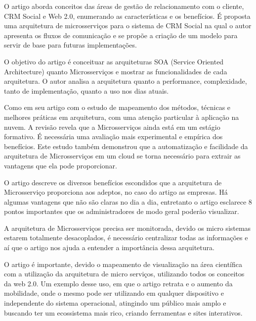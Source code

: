 O artigo \cite{Chiaradia2018} aborda conceitos das áreas de gestão de relacionamento com o cliente, CRM Social e Web 2.0, enumerando as características e os benefícios. É proposta uma arquitetura de microsserviços para o sistema de CRM Social na qual o autor apresenta os fluxos de comunicação e se propõe a criação de um modelo para servir de base para futuras implementações. 

O objetivo do artigo \cite{TomasCerny2017} é conceituar as arquiteturas SOA (Service Oriented Architecture) quanto Microsserviços e mostrar as funcionalidades de cada arquitetura. O autor analisa a arquitetura quanto a performance, complexidade, tanto de implementação, quanto a uso nos dias atuais. 

Como \cite{Pahl2016} em seu artigo com o estudo de mapeamento dos métodos, técnicas e melhores práticas em arquitetura, com uma atenção particular à aplicação na nuvem. A revisão revela que a Microsserviços ainda está em um estágio formativo. É necessária uma avaliação mais experimental e empírica dos benefícios. Este estudo também demonstrou que a automatização e facilidade da arquitetura de Microsserviços em um cloud se torna necessário para extrair as vantagens que ela pode proporcionar.

O artigo \cite{Tom2016} descreve os diversos benefícios escondidos que a arquitetura de Microsserviço proporciona aos adeptos, no caso do artigo as empresas. Há algumas vantagens que não são claras no dia a dia, entretanto o artigo esclarece 8 pontos importantes que os administradores de modo geral poderão visualizar.

A arquitetura de Microsserviços  precisa ser monitorada, devido os micro sistemas estarem totalmente desacoplados, é necessário centralizar todas as informações e aí que o artigo \cite{Ghirotti2018} nos ajuda a entender a importância dessa arquitetura.

O artigo \cite{Raji2015} é importante, devido o mapeamento de visualização na área científica com a utilização da arquitetura de micro serviços, utilizando todos os conceitos da web 2.0. Um exemplo desse uso, em que o artigo retrata e o aumento da mobilidade, onde o mesmo pode ser utilizando em qualquer dispositivo e independente do sistema operacional, atingindo um público mais amplo e buscando ter um ecossistema mais rico, criando ferramentas e sites interativos. 


